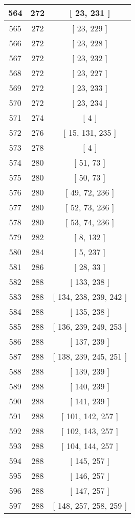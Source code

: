 \begin{center}
\begin{longtable}[H]{|| c c c ||}
564 & 272 & [ 23, 231 ] \\ 
\hline
565 & 272 & [ 23, 229 ] \\ 
\hline
566 & 272 & [ 23, 228 ] \\ 
\hline
567 & 272 & [ 23, 232 ] \\ 
\hline
568 & 272 & [ 23, 227 ] \\ 
\hline
569 & 272 & [ 23, 233 ] \\ 
\hline
570 & 272 & [ 23, 234 ] \\ 
\hline
571 & 274 & [ 4 ] \\ 
\hline
572 & 276 & [ 15, 131, 235 ] \\ 
\hline
573 & 278 & [ 4 ] \\ 
\hline
574 & 280 & [ 51, 73 ] \\ 
\hline
575 & 280 & [ 50, 73 ] \\ 
\hline
576 & 280 & [ 49, 72, 236 ] \\ 
\hline
577 & 280 & [ 52, 73, 236 ] \\ 
\hline
578 & 280 & [ 53, 74, 236 ] \\ 
\hline
579 & 282 & [ 8, 132 ] \\ 
\hline
580 & 284 & [ 5, 237 ] \\ 
\hline
581 & 286 & [ 28, 33 ] \\ 
\hline
582 & 288 & [ 133, 238 ] \\ 
\hline
583 & 288 & [ 134, 238, 239, 242 ] \\ 
\hline
584 & 288 & [ 135, 238 ] \\ 
\hline
585 & 288 & [ 136, 239, 249, 253 ] \\ 
\hline
586 & 288 & [ 137, 239 ] \\ 
\hline
587 & 288 & [ 138, 239, 245, 251 ] \\ 
\hline
588 & 288 & [ 139, 239 ] \\ 
\hline
589 & 288 & [ 140, 239 ] \\ 
\hline
590 & 288 & [ 141, 239 ] \\ 
\hline
591 & 288 & [ 101, 142, 257 ] \\ 
\hline
592 & 288 & [ 102, 143, 257 ] \\ 
\hline
593 & 288 & [ 104, 144, 257 ] \\ 
\hline
594 & 288 & [ 145, 257 ] \\ 
\hline
595 & 288 & [ 146, 257 ] \\ 
\hline
596 & 288 & [ 147, 257 ] \\ 
\hline
597 & 288 & [ 148, 257, 258, 259 ] \\ 

\end{longtable}
\end{center}
